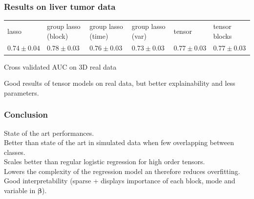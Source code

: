 \documentclass{beamer}
\begin{document}
\begin{frame}
    \frametitle{Results on liver tumor data}
    \begin{table}[H]
        \centering
        \label{tab:result_real}
        \renewcommand{\arraystretch}{1.2} 
        \begin{adjustbox}{center}
        \begin{tabular}{|>{\centering\arraybackslash}m{1.1cm}|>{\centering\arraybackslash}m{1.8cm}|>{\centering\arraybackslash}m{1.8cm}|>{\centering\arraybackslash}m{1.8cm}|>{\centering\arraybackslash}m{1.1cm}|>{\centering\arraybackslash}m{1.1cm}|}
            \cline{1-6}
             lasso & group lasso (block) & group lasso (time)& group lasso (var) & tensor & tensor blocks\\
            \cline{1-6} 
             $0.74 \pm 0.04$& $0.78 \pm 0.03$ & $0.76 \pm 0.03$ & $0.73 \pm 0.03$ & $0.77 \pm 0.03$ & $0.77 \pm 0.03$ \\
            \cline{1-6}
        \end{tabular}
        
    \end{adjustbox}
    \parbox{0.9\textwidth}{
    \vspace{0.2 cm}    
    \centering \small Cross validated AUC on 3D real data}
    \vspace{0.3 cm}
    \end{table}

    Good results of tensor models on real data, but better explainability  and less parameters.
\end{frame}

\begin{frame}
    \frametitle{Conclusion}
    State of the art performances.\\[15 pt]
    Better than state of the art in simulated data when few overlapping between classes.\\[15 pt]
    Scales better than regular logistic regression for high order tensors.\\[15 pt]
    Lowers the complexity of the regression model an therefore reduces overfitting.\\[15 pt]
    Good interpretability (sparse + displays importance of each block, mode and variable in $\bm{\beta}$).

\end{frame}

\end{document}
